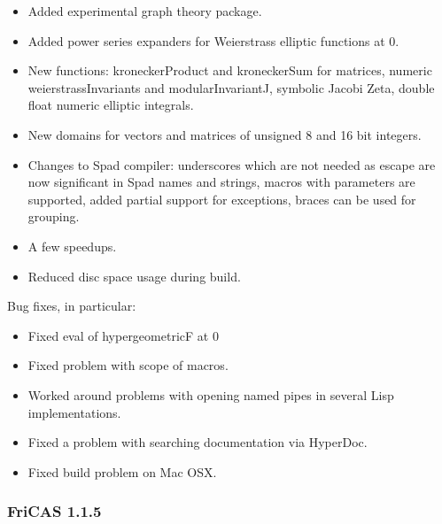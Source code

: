 \begin{itemize}
\item Added experimental graph theory package.

\item Added power series expanders for Weierstrass elliptic functions
  at 0.

\item New functions: kroneckerProduct and kroneckerSum for matrices,
  numeric weierstrassInvariants and modularInvariantJ, symbolic Jacobi
  Zeta, double float numeric elliptic integrals.

\item New domains for vectors and matrices of unsigned 8 and 16 bit
  integers.

\item Changes to Spad compiler: underscores which are not needed as
  escape are now significant in Spad names and strings, macros with
  parameters are supported, added partial support for exceptions,
  braces can be used for grouping.

\item A few speedups.

\item Reduced disc space usage during build.
\end{itemize}

Bug fixes, in particular:

\begin{itemize}
\item Fixed eval of hypergeometricF at 0

\item Fixed problem with scope of macros.

\item Worked around problems with opening named pipes in several Lisp
  implementations.

\item Fixed a problem with searching documentation via HyperDoc.

\item Fixed build problem on Mac OSX.
\end{itemize}

\subsubsection{FriCAS 1.1.5}

